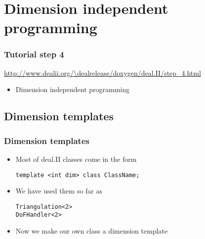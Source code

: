 
\section[DIP]{Dimension independent programming}

\begin{frame}
  \frametitle{Tutorial step 4}
  {\footnotesize{\url{http://www.dealii.org/\dealrelease/doxygen/deal.II/step_4.html}}}
  \begin{itemize}
  \item Dimension independent programming
  \end{itemize}
\end{frame}

\subsection{Dimension templates}
\begin{frame}[fragile]
  \frametitle{Dimension templates}
  \begin{itemize}
  \item Most of deal.II classes come in the form
    \begin{block}{}
\begin{lstlisting}
template <int dim> class ClassName;
\end{lstlisting}      
    \end{block}
  \item We have used them so far as
    \begin{block}{}
\begin{lstlisting}
Triangulation<2>
DoFHandler<2>
\end{lstlisting}      
    \end{block}
  \item Now we make our own class a dimension template
  \end{itemize}
\end{frame}

